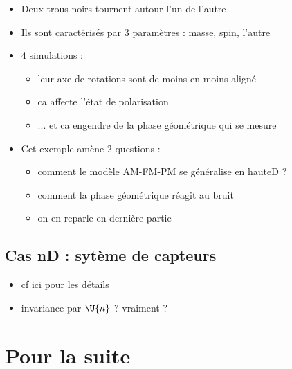 \begin{itemize}
	
	\item Deux trous noirs tournent autour l'un de l'autre
	
	\item Ils sont caractérisés par 3 paramètres : masse, spin, l'autre
	
	\item 4 simulations : \begin{itemize}
		
		\item leur axe de rotations sont de moins en moins aligné
		
		\item ca affecte l'état de polarisation 
		
		\item ... et ca engendre de la phase géométrique qui se mesure
	\end{itemize}
	
	\item Cet exemple amène 2 questions : \begin{itemize}
		
		\item comment le modèle AM-FM-PM se généralise en hauteD ?
		
		\item comment la phase géométrique réagit au bruit
		
		\item on en reparle en dernière partie

	\end{itemize}
\end{itemize}

\subsection{\todo Cas nD : sytème de capteurs} \label{subsec:ex-nD}

\begin{itemize}
	
	\item cf \href{https://theses.hal.science/tel-00199884}{ici} pour les détails
	
	\item invariance par $\U{n}$ ? vraiment ?
\end{itemize}



\section{\todo Pour la suite}\label{sec:2lasuite}


